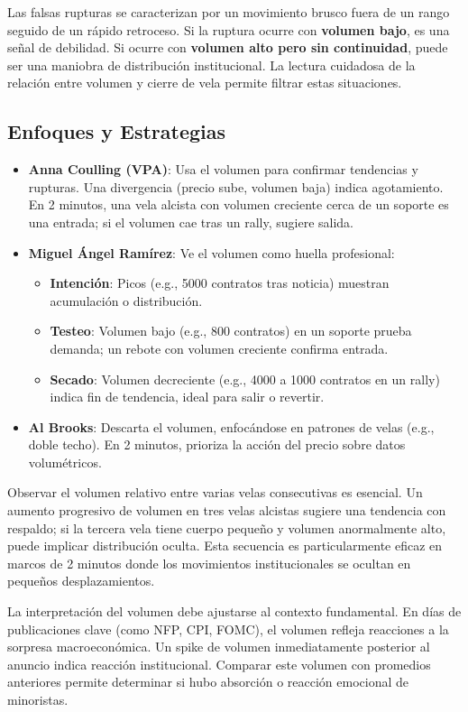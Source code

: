 Las falsas rupturas se caracterizan por un movimiento brusco fuera de un rango seguido de un r\'apido retroceso. Si la ruptura ocurre con \textbf{volumen bajo}, es una se\~nal de debilidad. Si ocurre con \textbf{volumen alto pero sin continuidad}, puede ser una maniobra de distribuci\'on institucional. La lectura cuidadosa de la relaci\'on entre volumen y cierre de vela permite filtrar estas situaciones.

\subsection{Enfoques y Estrategias}
\begin{itemize}
    \item \textbf{Anna Coulling (VPA)}: Usa el volumen para confirmar tendencias y rupturas. Una divergencia (precio sube, volumen baja) indica agotamiento. En 2 minutos, una vela alcista con volumen creciente cerca de un soporte es una entrada; si el volumen cae tras un rally, sugiere salida.
    \item \textbf{Miguel \'Angel Ram\'irez}: Ve el volumen como huella profesional:
    \begin{itemize}
        \item \textbf{Intenci\'on}: Picos (e.g., 5000 contratos tras noticia) muestran acumulaci\'on o distribuci\'on.
        \item \textbf{Testeo}: Volumen bajo (e.g., 800 contratos) en un soporte prueba demanda; un rebote con volumen creciente confirma entrada.
        \item \textbf{Secado}: Volumen decreciente (e.g., 4000 a 1000 contratos en un rally) indica fin de tendencia, ideal para salir o revertir.
    \end{itemize}
    \item \textbf{Al Brooks}: Descarta el volumen, enfoc\'andose en patrones de velas (e.g., doble techo). En 2 minutos, prioriza la acci\'on del precio sobre datos volum\'etricos.
\end{itemize}

Observar el volumen relativo entre varias velas consecutivas es esencial. Un aumento progresivo de volumen en tres velas alcistas sugiere una tendencia con respaldo; si la tercera vela tiene cuerpo peque\~no y volumen anormalmente alto, puede implicar distribuci\'on oculta. Esta secuencia es particularmente eficaz en marcos de 2 minutos donde los movimientos institucionales se ocultan en peque\~nos desplazamientos.

La interpretaci\'on del volumen debe ajustarse al contexto fundamental. En d\'ias de publicaciones clave (como NFP, CPI, FOMC), el volumen refleja reacciones a la sorpresa macroecon\'omica. Un spike de volumen inmediatamente posterior al anuncio indica reacci\'on institucional. Comparar este volumen con promedios anteriores permite determinar si hubo absorci\'on o reacci\'on emocional de minoristas.

